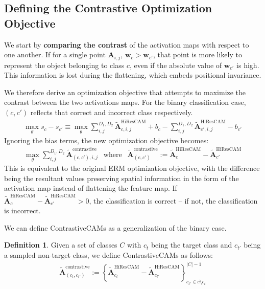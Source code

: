 \documentclass{article}
\theoremstyle{plain}
\theoremstyle{definition}
\newtheorem{definition}[theorem]{Definition}
\theoremstyle{remark}
\begin{document}
\subsection{Defining the Contrastive Optimization Objective}
\label{sec:define-cont-cams}

We start by \textbf{comparing the contrast} of the activation maps with respect to one another. If for a single point $\bm{A}_{i,j}$, $\bm{w}_c > \bm{w}_{c'}$, that point is more likely to represent the object belonging to class $c$, even if the absolute value of $\bm{w}_{c'}$ is high. This information is lost during the flattening, which embeds positional invariance.

We therefore derive an optimization objective that attempts to maximize the contrast between the two activations maps. For the binary classification case, $(c, c')$ reflects that correct and incorrect class respectively.
\begin{gather}
	\max_{\theta} s_c - s_{c'} \equiv \max_{\theta} \sum^{D_1,D_2}_{i,j} \tilde{\mathcal{\bm{A}}}_{c,i,j}^{\text{HiResCAM}} + b_c - \sum^{D_1,D_2}_{i,j} \tilde{\mathcal{\bm{A}}}_{c',i,j}^{\text{HiResCAM}} - b_{c'}
\end{gather}
Ignoring the bias terms, the new optimization objective becomes:
\begin{gather}
	\max_{\theta} \sum^{D_1,D_2}_{i,j} \tilde{\mathcal{\bm{A}}}^{\text{contrastive}}_{(c, c'), i, j} ~~\text{ where }~~ \tilde{\mathcal{\bm{A}}}^{\text{contrastive}}_{(c, c')} := \tilde{\mathcal{\bm{A}}}_{c}^{\text{HiResCAM}} - \tilde{\mathcal{\bm{A}}}_{c'}^{\text{HiResCAM}}
\end{gather}
This is equivalent to the original ERM optimization objective, with the difference being the resultant values preserving spatial information in the form of the activation map instead of flattening the feature map. If $\tilde{\mathcal{\bm{A}}}_{c}^{\text{HiResCAM}} - \tilde{\mathcal{\bm{A}}}_{c'}^{\text{HiResCAM}} > 0$, the classification is correct -- if not, the classification is incorrect. 

We can define ContrastiveCAMs as a generalization of the binary case.

\begin{definition}
	Given a set of classes $C$ with $c_t$ being the target class and $c_{t'}$ being a sampled non-target class, we define ContrastiveCAMs as follows:
	\begin{gather}
		\tilde{\mathcal{\bm{A}}}^{\text{contrastive}}_{(c_t, c_{t'})} := \left\{\tilde{\mathcal{\bm{A}}}_{c_t}^{\text{HiResCAM}} - \tilde{\mathcal{\bm{A}}}_{c_{t'}}^{\text{HiResCAM}}\right\}^{|C|-1}_{c_{t'} \in c \setminus c_t}
	\end{gather}
\end{definition}
\end{document}
